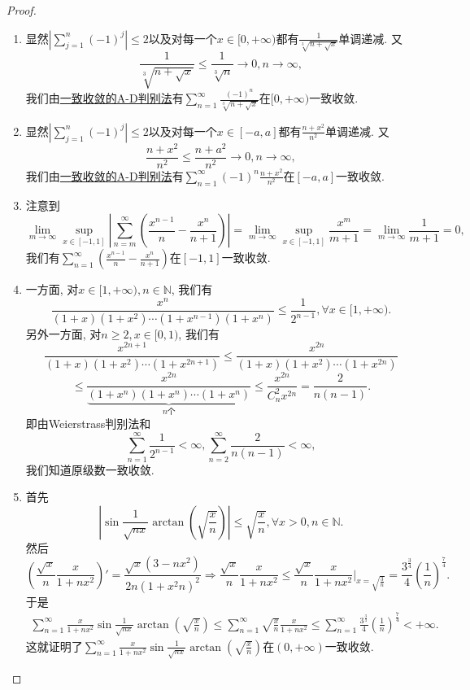 \documentclass[../../main.tex]{subfiles}
\begin{document}
\begin{proof}
\begin{enumerate}
\item 显然\(\left| \sum_{j=1}^{n} (-1)^j \right| \leqslant 2\)以及对每一个\(x \in [0, +\infty)\)都有\(\frac{1}{\sqrt[3]{n + \sqrt{x}}}\)单调递减. 又
\[
\frac{1}{\sqrt[3]{n + \sqrt{x}}} \leqslant \frac{1}{\sqrt[3]{n}} \to 0, n \to \infty,
\]
我们由\hyperref[theorem:级数一致收敛的A-D判别法]{一致收敛的A-D判别法}有\(\sum_{n=1}^{\infty} \frac{(-1)^n}{\sqrt[3]{n + \sqrt{x}}}\)在\([0, +\infty)\)一致收敛.

\item 显然\(\left| \sum_{j=1}^{n} (-1)^j \right| \leqslant 2\)以及对每一个\(x \in [-a, a]\)都有\(\frac{n + x^2}{n^2}\)单调递减. 又
\[
\frac{n + x^2}{n^2} \leqslant \frac{n + a^2}{n^2} \to 0, n \to \infty,
\]
我们由\hyperref[theorem:级数一致收敛的A-D判别法]{一致收敛的A-D判别法}有\(\sum_{n=1}^{\infty} (-1)^n \frac{n + x^2}{n^2}\)在\([-a, a]\)一致收敛.

\item 注意到
\[
\lim_{m \to \infty} \sup_{x \in [-1, 1]} \left| \sum_{n=m}^{\infty} \left( \frac{x^{n - 1}}{n} - \frac{x^n}{n + 1} \right) \right| = \lim_{m \to \infty} \sup_{x \in [-1, 1]} \frac{x^m}{m + 1} = \lim_{m \to \infty} \frac{1}{m + 1} = 0,
\]
我们有\(\sum_{n=1}^{\infty} \left( \frac{x^{n - 1}}{n} - \frac{x^n}{n + 1} \right)\)在\([-1, 1]\)一致收敛.

\item 一方面, 对\(x \in [1, +\infty), n \in \mathbb{N}\), 我们有
\[
\frac{x^n}{(1 + x)(1 + x^2) \cdots (1 + x^{n - 1})(1 + x^n)} \leqslant \frac{1}{2^{n - 1}}, \forall x \in [1, +\infty).
\]
另外一方面, 对\(n \geqslant 2, x \in [0, 1)\), 我们有
\[
\frac{x^{2n + 1}}{(1 + x)(1 + x^2) \cdots (1 + x^{2n + 1})} \leqslant \frac{x^{2n}}{(1 + x)(1 + x^2) \cdots (1 + x^{2n})}
\]
\[
\leqslant \frac{x^{2n}}{\underbrace{(1 + x^n)(1 + x^n) \cdots (1 + x^n)}_{n \text{个}}} \leqslant \frac{x^{2n}}{C_n^2 x^{2n}} = \frac{2}{n(n - 1)}.
\]
即由Weierstrass判别法和
\[
\sum_{n=1}^{\infty} \frac{1}{2^{n - 1}} < \infty, \sum_{n=2}^{\infty} \frac{2}{n(n - 1)} < \infty,
\]
我们知道原级数一致收敛.

\item 首先
\[
\left| \sin \frac{1}{\sqrt{nx}} \arctan \left( \sqrt{\frac{x}{n}} \right) \right| \leqslant \sqrt{\frac{x}{n}}, \forall x > 0, n \in \mathbb{N}.
\]
然后
\[
\left( \frac{\sqrt{x}}{n} \frac{x}{1 + nx^2} \right)' = \frac{\sqrt{x}(3 - nx^2)}{2n(1 + x^2 n)^2} \Rightarrow \frac{\sqrt{x}}{n} \frac{x}{1 + nx^2} \leqslant \frac{\sqrt{x}}{n} \frac{x}{1 + nx^2} \bigg|_{x = \sqrt{\frac{3}{n}}} = \frac{3^{\frac{3}{4}}}{4} \left( \frac{1}{n} \right)^{\frac{7}{4}}.
\]
于是
\begin{align*}
\sum_{n=1}^{\infty}{\frac{x}{1+nx^2}\sin \frac{1}{\sqrt{nx}}\arctan  \left( \sqrt{\frac{x}{n}} \right)}\leqslant \sum_{n=1}^{\infty}{\sqrt{\frac{x}{n}}\frac{x}{1+nx^2}}\leqslant \sum_{n=1}^{\infty}{\frac{3^{\frac{3}{4}}}{4}\left( \frac{1}{n} \right) ^{\frac{7}{4}}}<+\infty.
\end{align*}
这就证明了\(\sum_{n=1}^{\infty} \frac{x}{1 + nx^2} \sin \frac{1}{\sqrt{nx}} \arctan \left( \sqrt{\frac{x}{n}} \right)\)在\((0, +\infty)\)一致收敛.


\end{enumerate}
\end{proof}
\end{document}
